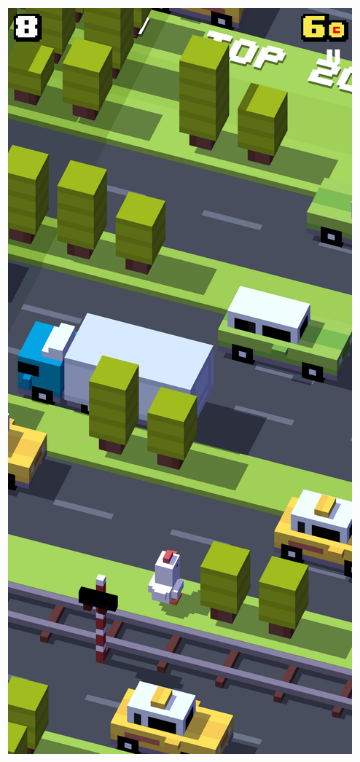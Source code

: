\documentclass[12pt,a4paper]{report}
\begin{document}
\begin{figure}[bt]
\begin{subfigure}{.32\textwidth}
  \centering
  \includegraphics[width=.95\linewidth]{snapshot_road}

\end{subfigure}
\end{figure}
\end{document}

